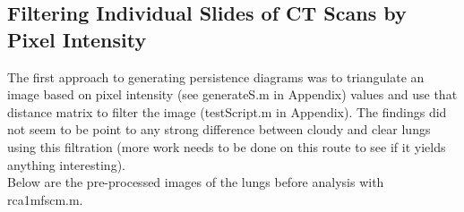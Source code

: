 \documentclass[12pt]{report}
\begin{document}
\subsection{Filtering Individual Slides of CT Scans by Pixel Intensity}

The first approach to generating persistence diagrams was to triangulate an image based on pixel intensity (see generateS.m in Appendix) values and use that distance matrix to filter the image (testScript.m in Appendix). The findings did not seem to be point to any strong difference between cloudy and clear lungs using this filtration (more work needs to be done on this route to see if it yields anything interesting).\newline
\\
Below are the pre-processed images of the lungs before analysis with rca1mfscm.m.
\end{document}
